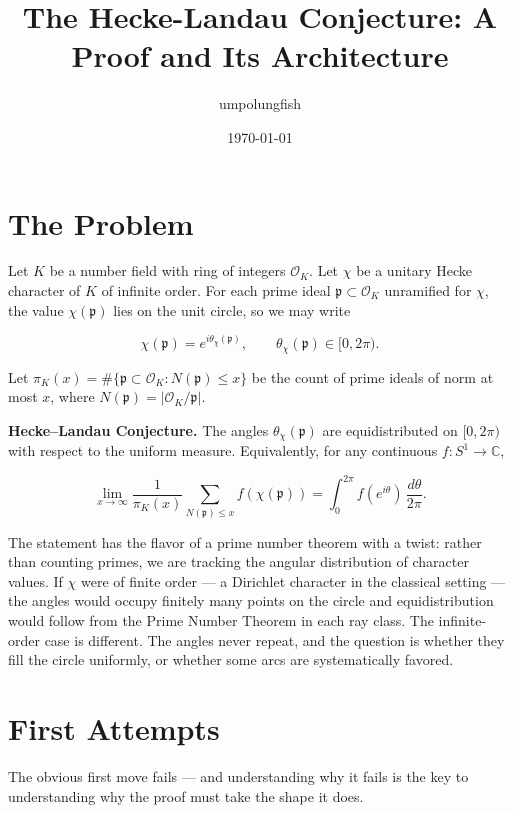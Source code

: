 \documentclass[12pt,a4paper]{article}
\begin{document}
\title{The Hecke-Landau Conjecture: A Proof and Its Architecture}
\author{umpolungfish}
\date{\today}

\maketitle

\section{The Problem}

Let $K$ be a number field with ring of integers $\mathcal{O}_K$. Let $\chi$ be a unitary Hecke character of $K$ of infinite order. For each prime ideal $\mathfrak{p} \subset \mathcal{O}_K$ unramified for $\chi$, the value $\chi(\mathfrak{p})$ lies on the unit circle, so we may write

\[
\chi(\mathfrak{p}) = e^{i\theta_{\chi}(\mathfrak{p})}, \qquad \theta_{\chi}(\mathfrak{p}) \in [0, 2\pi).
\]

Let $\pi_K(x) = \#\{\mathfrak{p} \subset \mathcal{O}_K : N(\mathfrak{p}) \leq x\}$ be the count of prime ideals of norm at most $x$, where $N(\mathfrak{p}) = |\mathcal{O}_K/\mathfrak{p}|$.

\textbf{Hecke--Landau Conjecture.} The angles $\theta_{\chi}(\mathfrak{p})$ are equidistributed on $[0,2\pi)$ with respect to the uniform measure. Equivalently, for any continuous $f: S^1 \to \mathbb{C}$,

\[
\lim_{x \to \infty} \frac{1}{\pi_K(x)} \sum_{N(\mathfrak{p}) \leq x} f(\chi(\mathfrak{p})) = \int_0^{2\pi} f(e^{i\theta}) \, \frac{d\theta}{2\pi}.
\]

The statement has the flavor of a prime number theorem with a twist: rather than counting primes, we are tracking the angular distribution of character values. If $\chi$ were of finite order --- a Dirichlet character in the classical setting --- the angles would occupy finitely many points on the circle and equidistribution would follow from the Prime Number Theorem in each ray class. The infinite-order case is different. The angles never repeat, and the question is whether they fill the circle uniformly, or whether some arcs are systematically favored.

\section{First Attempts}

The obvious first move fails --- and understanding why it fails is the key to understanding why the proof must take the shape it does.
\end{document}
